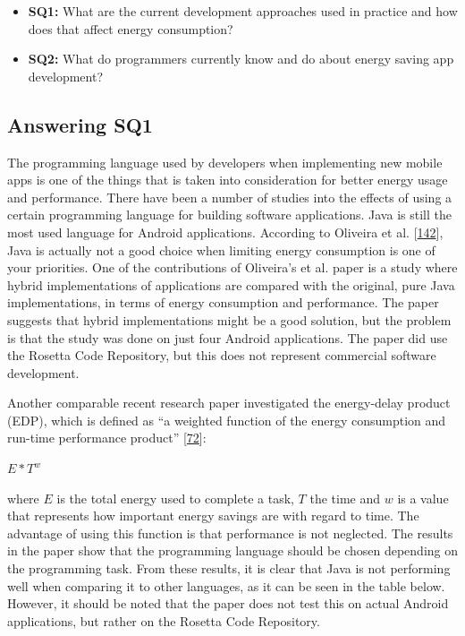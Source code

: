 \documentclass[]{book}
\providecommand{\tightlist}{%
  \setlength{\itemsep}{0pt}\setlength{\parskip}{0pt}}
\begin{document}
\begin{itemize}
\tightlist
\item
  \textbf{SQ1:} What are the current development approaches used in
  practice and how does that affect energy consumption?
\item
  \textbf{SQ2:} What do programmers currently know and do about energy
  saving app development?
\end{itemize}

\subsection{Answering SQ1}\label{answering-sq1}

The programming language used by developers when implementing new mobile
apps is one of the things that is taken into consideration for better
energy usage and performance. There have been a number of studies into
the effects of using a certain programming language for building
software applications. Java is still the most used language for Android
applications. According to Oliveira et al.
{[}\protect\hyperlink{ref-OOC2017}{142}{]}, Java is actually not a good
choice when limiting energy consumption is one of your priorities. One
of the contributions of Oliveira's et al. paper is a study where hybrid
implementations of applications are compared with the original, pure
Java implementations, in terms of energy consumption and performance.
The paper suggests that hybrid implementations might be a good solution,
but the problem is that the study was done on just four Android
applications. The paper did use the Rosetta Code Repository, but this
does not represent commercial software development.

Another comparable recent research paper investigated the energy-delay
product (EDP), which is defined as ``a weighted function of the energy
consumption and run-time performance product''
{[}\protect\hyperlink{ref-GKLS2018}{72}{]}:

\(E * T^w\)

where \(E\) is the total energy used to complete a task, \(T\) the time
and \(w\) is a value that represents how important energy savings are
with regard to time. The advantage of using this function is that
performance is not neglected. The results in the paper show that the
programming language should be chosen depending on the programming task.
From these results, it is clear that Java is not performing well when
comparing it to other languages, as it can be seen in the table below.
However, it should be noted that the paper does not test this on actual
Android applications, but rather on the Rosetta Code Repository.
\end{document}
